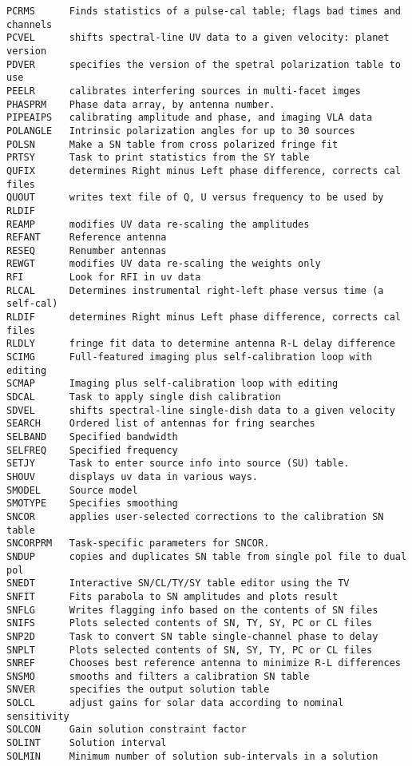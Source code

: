 \begin{verbatim}
PCRMS      Finds statistics of a pulse-cal table; flags bad times and channels
PCVEL      shifts spectral-line UV data to a given velocity: planet version
PDVER      specifies the version of the spetral polarization table to use
PEELR      calibrates interfering sources in multi-facet imges
PHASPRM    Phase data array, by antenna number.
PIPEAIPS   calibrating amplitude and phase, and imaging VLA data
POLANGLE   Intrinsic polarization angles for up to 30 sources
POLSN      Make a SN table from cross polarized fringe fit
PRTSY      Task to print statistics from the SY table
QUFIX      determines Right minus Left phase difference, corrects cal files
QUOUT      writes text file of Q, U versus frequency to be used by RLDIF
REAMP      modifies UV data re-scaling the amplitudes
REFANT     Reference antenna
RESEQ      Renumber antennas
REWGT      modifies UV data re-scaling the weights only
RFI        Look for RFI in uv data
RLCAL      Determines instrumental right-left phase versus time (a self-cal)
RLDIF      determines Right minus Left phase difference, corrects cal files
RLDLY      fringe fit data to determine antenna R-L delay difference
SCIMG      Full-featured imaging plus self-calibration loop with editing
SCMAP      Imaging plus self-calibration loop with editing
SDCAL      Task to apply single dish calibration
SDVEL      shifts spectral-line single-dish data to a given velocity
SEARCH     Ordered list of antennas for fring searches
SELBAND    Specified bandwidth
SELFREQ    Specified frequency
SETJY      Task to enter source info into source (SU) table.
SHOUV      displays uv data in various ways.
SMODEL     Source model
SMOTYPE    Specifies smoothing
SNCOR      applies user-selected corrections to the calibration SN table
SNCORPRM   Task-specific parameters for SNCOR.
SNDUP      copies and duplicates SN table from single pol file to dual pol
SNEDT      Interactive SN/CL/TY/SY table editor using the TV
SNFIT      Fits parabola to SN amplitudes and plots result
SNFLG      Writes flagging info based on the contents of SN files
SNIFS      Plots selected contents of SN, TY, SY, PC or CL files
SNP2D      Task to convert SN table single-channel phase to delay
SNPLT      Plots selected contents of SN, SY, TY, PC or CL files
SNREF      Chooses best reference antenna to minimize R-L differences
SNSMO      smooths and filters a calibration SN table
SNVER      specifies the output solution table
SOLCL      adjust gains for solar data according to nominal sensitivity
SOLCON     Gain solution constraint factor
SOLINT     Solution interval
SOLMIN     Minimum number of solution sub-intervals in a solution

\end{verbatim}
